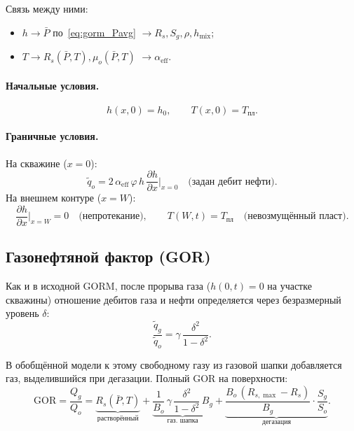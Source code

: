 \documentclass[12pt,a4paper]{article}
\begin{document}
Связь между ними:
\begin{itemize}[nosep]
  \item $h \to \bar{P}$ по~\eqref{eq:gorm_Pavg}
        $\to R_s, S_g, \rho, h_{\mathrm{mix}}$;
  \item $T \to R_s(\bar{P},T), \mu_o(\bar{P},T)$
        $\to \alpha_{\mathrm{eff}}$.
\end{itemize}

\paragraph{Начальные условия.}
\begin{equation}\label{eq:gorm_IC}
  h(x, 0) = h_0, \qquad T(x, 0) = T_{\text{пл}}.
\end{equation}

\paragraph{Граничные условия.}
На скважине ($x = 0$):
\begin{equation}\label{eq:gorm_BC_well}
  \tilde{q}_o = 2\,\alpha_{\mathrm{eff}}\,\varphi\,h\,
    \frac{\partial h}{\partial x}\bigg|_{x=0}
  \quad\text{(задан дебит нефти)}.
\end{equation}
На внешнем контуре ($x = W$):
\begin{equation}\label{eq:gorm_BC_outer}
  \frac{\partial h}{\partial x}\bigg|_{x=W} = 0
  \quad\text{(непротекание)}, \qquad
  T(W, t) = T_{\text{пл}}
  \quad\text{(невозмущённый пласт)}.
\end{equation}

\subsection{Газонефтяной фактор (GOR)}

Как и в исходной GORM, после прорыва газа ($h(0,t) = 0$
на участке скважины) отношение дебитов газа и нефти определяется
через безразмерный уровень $\delta$:
\begin{equation}\label{eq:gorm_GOR_base}
  \frac{\tilde{q}_g}{\tilde{q}_o} = \gamma\,
    \frac{\delta^2}{1 - \delta^2}.
\end{equation}

В обобщённой модели к этому свободному газу из газовой шапки добавляется
газ, выделившийся при дегазации. Полный GOR на поверхности:
\begin{equation}\label{eq:gorm_GOR_total}
  \boxed{\;
    \mathrm{GOR} = \frac{Q_g}{Q_o}
    = \underbrace{R_s(\bar{P},T)}_{\text{растворённый}}
    + \underbrace{\frac{1}{B_o}\,\gamma\,
      \frac{\delta^2}{1-\delta^2}\,B_g}_{\text{газ.\ шапка}}
    + \underbrace{\frac{B_o\,(R_{s,\max} - R_s)}{B_g}
      \cdot\frac{S_g}{S_o}}_{\text{дегазация}}.
  \;}
\end{equation}
\end{document}
